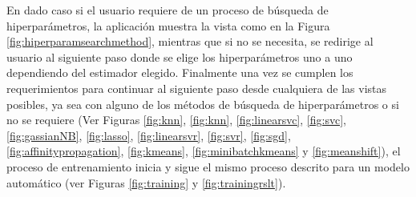 En dado caso si el usuario requiere de un proceso de búsqueda de hiperparámetros, la aplicación muestra la vista como en la Figura \ref{fig:hiperparamsearchmethod}, mientras que si no se necesita, se redirige al usuario al siguiente paso donde se elige los hiperparámetros uno a uno dependiendo del estimador elegido. Finalmente una vez se cumplen los requerimientos para continuar al siguiente paso desde cualquiera de las vistas posibles, ya sea con alguno de los métodos de búsqueda de hiperparámetros o si no se requiere (Ver Figuras \ref{fig:knn}, \ref{fig:knn}, \ref{fig:linearsvc}, \ref{fig:svc}, \ref{fig:gassianNB}, \ref{fig:lasso}, \ref{fig:linearsvr}, \ref{fig:svr}, \ref{fig:sgd}, \ref{fig:affinitypropagation}, \ref{fig:kmeans}, \ref{fig:minibatchkmeans} y \ref{fig:meanshift}), el proceso de entrenamiento inicia y sigue el mismo proceso descrito para un modelo automático (ver Figuras \ref{fig:training} y \ref{fig:trainingrslt}).
